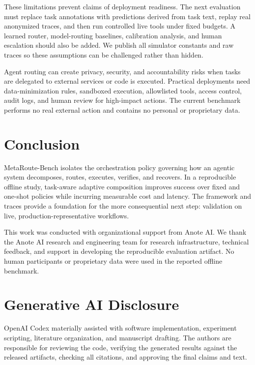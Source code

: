 \documentclass[sigconf]{acmart}
\begin{document}
These limitations prevent claims of deployment readiness. The next evaluation must replace task annotations with predictions derived from task text, replay real anonymized traces, and then run controlled live tools under fixed budgets. A learned router, model-routing baselines, calibration analysis, and human escalation should also be added. We publish all simulator constants and raw traces so these assumptions can be challenged rather than hidden.

Agent routing can create privacy, security, and accountability risks when tasks are delegated to external services or code is executed. Practical deployments need data-minimization rules, sandboxed execution, allowlisted tools, access control, audit logs, and human review for high-impact actions. The current benchmark performs no real external action and contains no personal or proprietary data.

\section{Conclusion}

MetaRoute-Bench isolates the orchestration policy governing how an agentic system decomposes, routes, executes, verifies, and recovers. In a reproducible offline study, task-aware adaptive composition improves success over fixed and one-shot policies while incurring measurable cost and latency. The framework and traces provide a foundation for the more consequential next step: validation on live, production-representative workflows.

\begin{acks}
This work was conducted with organizational support from Anote AI. We thank the Anote AI research and engineering team for research infrastructure, technical feedback, and support in developing the reproducible evaluation artifact. No human participants or proprietary data were used in the reported offline benchmark.
\end{acks}

\section*{Generative AI Disclosure}
OpenAI Codex materially assisted with software implementation, experiment scripting, literature organization, and manuscript drafting. The authors are responsible for reviewing the code, verifying the generated results against the released artifacts, checking all citations, and approving the final claims and text.
\end{document}
